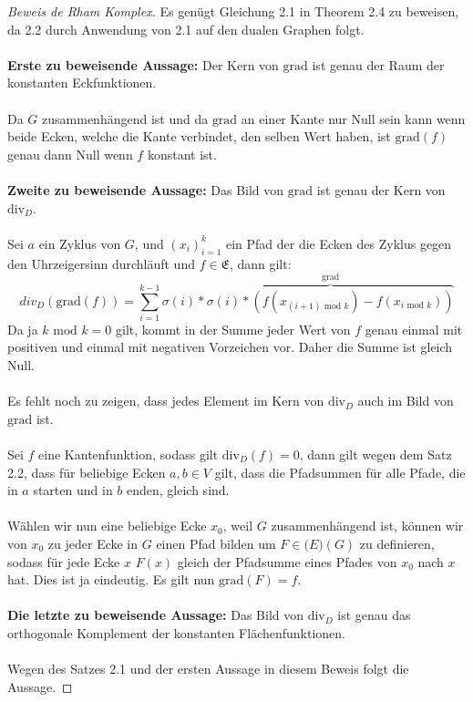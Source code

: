\documentclass[11pt,a4paper,leqno]{report}
\numberwithin{equation}{chapter}
\begin{document}
\begin{proof}[Beweis de Rham Komplex]
	Es gen\"ugt Gleichung 2.1 in Theorem 2.4 zu beweisen, da 2.2 durch Anwendung von 2.1 auf den dualen Graphen folgt.\\
	\\
	\textbf{Erste zu beweisende Aussage:} Der Kern von $\text{grad}$ ist genau der Raum der konstanten Eckfunktionen.\\
	\\
	Da $G$ zusammenh\"angend ist und da $\text{grad}$ an einer Kante nur Null sein kann wenn beide Ecken, welche die Kante verbindet, den selben Wert haben, ist $\text{grad}(f)$ genau dann Null wenn $f$ konstant ist.\\
	\\
	\textbf{Zweite zu beweisende Aussage:} Das Bild von $\text{grad}$ ist genau der Kern von $\text{div}_D$.\\
	\\
	Sei $a$ ein Zyklus von $G$, und $(x_i)_{i=1}^k$ ein Pfad der die Ecken des Zyklus gegen den Uhrzeigersinn durchl\"auft und $f\in\mathfrak{E}$, dann gilt:
	$$div_D(\text{grad}(f)) = \sum_{i=1}^{k-1} \sigma(i) * \overbrace{\sigma(i) * (f(x_{(i+1) \text{ mod } k})-f(x_{i  \text{ mod } k}))}^{\text{grad}}$$
	Da ja $k \text{ mod }k=0$ gilt, kommt in der Summe jeder Wert von $f$ genau einmal mit positiven und einmal mit negativen Vorzeichen vor. Daher die Summe ist gleich Null.\\
	\\
	Es fehlt noch zu zeigen, dass jedes Element im Kern von $\text{div}_D$ auch im Bild von $\text{grad}$ ist.\\
	\\
	Sei $f$ eine Kantenfunktion, sodass gilt $\text{div}_D(f)=0$, dann gilt wegen dem Satz 2.2, dass f\"ur beliebige Ecken $a, b\in V$ gilt, dass die Pfadsummen f\"ur alle Pfade, die in $a$ starten und in $b$ enden, gleich sind.\\
	\\
	W\"ahlen wir nun eine beliebige Ecke $x_0$, weil $G$ zusammenh\"angend ist, k\"onnen wir von $x_0$ zu jeder Ecke in $G$ einen Pfad bilden um $F\in\mathfrak(E)(G)$ zu definieren, sodass f\"ur jede Ecke $x$ $F(x)$ gleich der Pfadsumme eines Pfades von $x_0$ nach $x$ hat. Dies ist ja eindeutig. Es gilt nun $\text{grad}(F) = f$.
	\\
	\\
	\textbf{Die letzte zu beweisende Aussage:} Das Bild von $\text{div}_D$ ist genau das orthogonale Komplement der konstanten Fl\"achenfunktionen.\\
	\\
	Wegen des Satzes 2.1 und der ersten Aussage in diesem Beweis folgt die Aussage.
\end{proof}
\noindent
\end{document}
